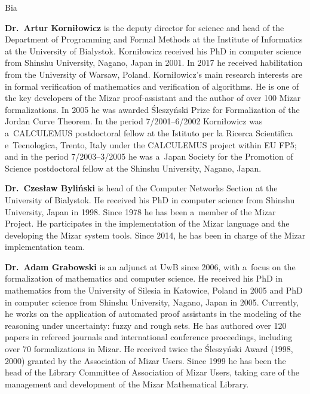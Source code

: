 \begin{sitedescription}{Bia}
\begin{compactitem}

\item\textbf{Dr.\ Artur Korniłowicz} is the deputy director for science and head of the Department of Programming and Formal Methods
at the Institute of Informatics at the University of Bialystok.
Korniłowicz received his PhD in computer science from Shinshu University, Nagano, Japan in 2001.
In 2017 he received habilitation from the University of Warsaw, Poland.
Korniłowicz's main research interests are in formal verification of mathematics and verification of algorithms.
He is one of the key developers of the Mizar proof-assistant and the author of over 100 Mizar formalizations.
In 2005 he was awarded {\'S}leszy\'nski Prize for Formalization of the Jordan Curve Theorem.
In the period 7/2001--6/2002 Korniłowicz was a~CALCULEMUS postdoctoral fellow at the Istituto per la Ricerca Scientifica e~Tecnologica, Trento, Italy under the CALCULEMUS project within EU FP5;
and in the period 7/2003--3/2005 he was a~Japan Society for the Promotion of Science postdoctoral fellow at the Shinshu University, Nagano, Japan.

\item\textbf{Dr.\ Czesław Byliński} is head of the Computer Networks Section at the University of Bialystok.
He received his PhD in computer science from Shinshu University, Japan in 1998.
Since 1978 he has been a~member of the Mizar Project.
He participates in the implementation of the Mizar language and the developing the Mizar system tools. 
Since 2014, he has been in charge of the Mizar implementation team.

\item\textbf{Dr.\ Adam Grabowski} is an adjunct at UwB since 2006, 
with a~focus on the formalization of mathematics and computer science.
He received his PhD in mathematics from the University of Silesia in Katowice, Poland in 2005 
and PhD in computer science from Shinshu University, Nagano, Japan in 2005.
Currently, he works on the application of automated proof assistants
in the modeling of the reasoning under uncertainty: fuzzy and rough sets.
He has authored over 120 papers in refereed journals and international conference
proceedings, including over 70 formalizations in Mizar.
He received twice the {\'S}leszy\'nski Award (1998, 2000) granted by the Association of Mizar Users.
Since 1999 he has been the head of the Library Committee of Association of Mizar Users, taking care of
the management and development of the Mizar Mathematical Library.


\end{compactitem}
\end{sitedescription}
